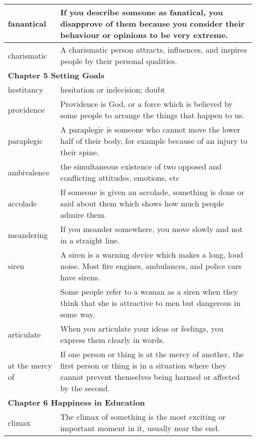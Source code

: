 \documentclass{article}
\begin{document}
\begin{center}
\begin{longtable}{|l|p{7cm}|}
\hline
fanantical
&
If you describe someone as fanatical, you disapprove of them because you consider their behaviour or opinions to be very extreme.
\\

\hline
charismatic
&
A charismatic person attracts, influences, and inspires people by their personal qualities.
\\

\hline
\multicolumn{2}{|l|}{\textbf{Chapter 5 Setting Goals}}\\
\hline
hestitancy
&
hesitation or indecision; doubt
\\

\hline
providence
&
Providence is God, or a force which is believed by some people to arrange the things that happen to us.
\\

\hline
paraplegic
&
A paraplegic is someone who cannot move the lower half of their body, for example because of an injury to their spine.
\\

\hline
ambivalence
&
the simultaneous existence of two opposed and conflicting attitudes, emotions, etc
\\

\hline
accolade
&
If someone is given an accolade, something is done or said about them which shows how much people admire them.
\\

\hline
meandering
&
If you meander somewhere, you move slowly and not in a straight line.
\\

\hline
siren
&
A siren is a warning device which makes a long, loud noise. Most fire engines, ambulances, and police cars have sirens.
\\

&
Some people refer to a woman as a siren when they think that she is attractive to men but dangerous in some way.
\\

\hline
articulate
&
When you articulate your ideas or feelings, you express them clearly in words.
\\

\hline
at the mercy of
&
If one person or thing is at the mercy of another, the first person or thing is in a situation where they cannot prevent themselves being harmed or affected by the second.
\\

\hline
\multicolumn{2}{|l|}{\textbf{Chapter 6 Happiness in Education}}
\\
\hline
climax
&
The climax of something is the most exciting or important moment in it, usually near the end.
\\


\end{longtable}
\end{center}
\end{document}
